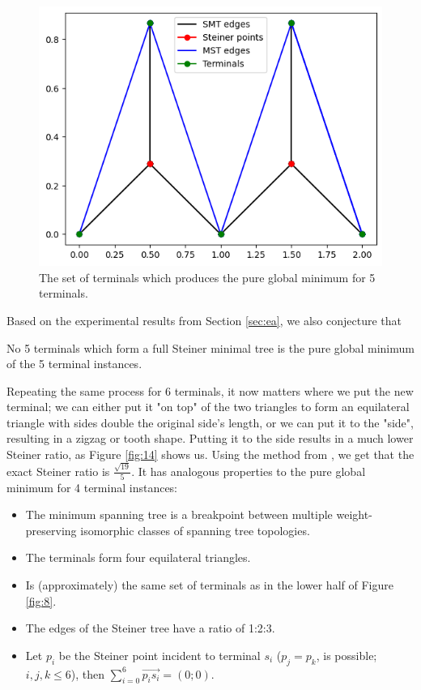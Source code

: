 \documentclass{mpaper}
\begin{document}
\begin{figure}[h!]
  \begin{center}
  \includegraphics[scale=0.5]{plot12.png}
  \end{center}
  \caption{\label{fig:13} The set of terminals which produces the pure global minimum for 5 terminals.}
\end{figure}

Based on the experimental results from Section \ref{sec:ea}, we also conjecture that
\begin{conjecture}
  No 5 terminals which form a full Steiner minimal tree is the pure global minimum of the 5 terminal instances.
\end{conjecture}

Repeating the same process for 6 terminals, it now matters where we put the new terminal; we can either put it "on top" of the two triangles to form an equilateral triangle with sides double the original side's length, or we can put it to the "side", resulting in a zigzag or tooth shape. Putting it to the side results in a much lower Steiner ratio, as Figure \ref{fig:14} shows us. Using the method from \cite{uteshev2021length}, we get that the exact Steiner ratio is $\frac{\sqrt{19}}{5}$. It has analogous properties to the pure global minimum for 4 terminal instances:

\begin{itemize}
  \item The minimum spanning tree is a breakpoint between multiple weight-preserving isomorphic classes of spanning tree topologies. %
  \item The terminals form four equilateral triangles.
  \item Is (approximately) the same set of terminals as in the lower half of Figure \ref{fig:8}.
  \item The edges of the Steiner tree have a ratio of 1:2:3.
  \item Let $p_i$ be the Steiner point incident to terminal $s_i$ ($p_j=p_k$, is possible; $i,j,k \leq 6$), then $\sum\limits_{i=0}^6\overrightarrow{p_is_i}=(0;0)$. 
\end{itemize}
\end{document}
